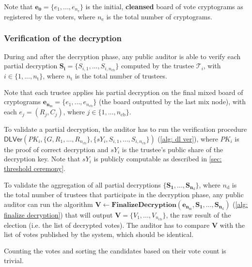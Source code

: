 Note that $\boldsymbol{e_0} = \{ e_1, ..., e_{n_\mathrm{e}} \}$ is the initial, \textbf{cleansed} board of vote cryptograms as registered by the voters, where $n_\mathrm{e}$ is the total number of cryptograms. 


\subsubsection{Verification of the decryption}
During and after the decryption phase, any public auditor is able to verify each partial decryption \( \boldsymbol{S_i} = \{ S_{i,1}, ..., S_{i,n_\mathrm{cb}} \} \) computed by the trustee $\mathcal{T}_i$, with \( i \in \{ 1, ..., n_\mathrm{t} \} \), where $n_\mathrm{t}$ is the total number of trustees. 

Note that each trustee applies his partial decryption on the final mixed board of cryptograms \( \boldsymbol{e_{n_\mathrm{m}}} = \{ e_1, ..., e_{n_\mathrm{cb}} \} \) (the board outputted by the last mix node), with each \( e_j = (R_j, C_j) \), where \( j \in \{ 1, ..., n_\mathrm{cb} \} \).

To validate a partial decryption, the auditor has to run the verification procedure $\mathsf{DLVer} (PK_i, \{ G, R_1, ..., R_{n_\mathrm{cb}} \}, \{ sY_i, S_{i,1}, ..., S_{i,n_\mathrm{cb}} \})$ (\cref{alg: dl ver}), where $PK_i$ is the proof of correct decryption and $sY_i$ is the trustee's public share of the decryption key. Note that $sY_i$ is publicly computable as described in \cref{sec: threshold ceremony}.

To validate the aggregation of all partial decryptions \( \{\boldsymbol{S_1}, ..., \boldsymbol{S_{n_\mathrm{d}}}\} \), where $n_\mathrm{d}$ is the total number of trustees that participate in the decryption phase, any public auditor can run the algorithm \( \boldsymbol{V} \leftarrow \mathbf{FinalizeDecryption} (\boldsymbol{e_{n_\mathrm{m}}}, \boldsymbol{S_1}, ..., \boldsymbol{S_{n_\mathrm{d}}}) \) (\cref{alg: finalize decryption}) that will output \( \boldsymbol{V} = \{ V_1, ..., V_{n_\mathrm{cb}} \} \), the raw result of the election (i.e. the list of decrypted votes). The auditor has to compare $\boldsymbol{V}$ with the list of votes published by the system, which should be identical.

Counting the votes and sorting the candidates based on their vote count is trivial.

